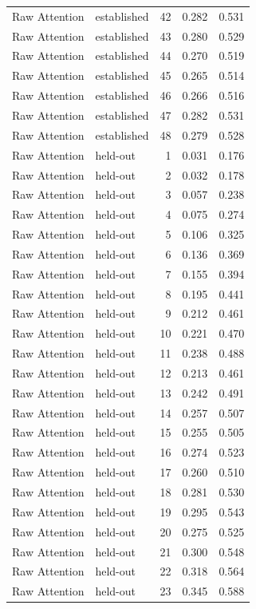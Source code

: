 \begin{tabular}{llrrr}
Raw Attention & established & 42 & 0.282 & 0.531 \\
Raw Attention & established & 43 & 0.280 & 0.529 \\
Raw Attention & established & 44 & 0.270 & 0.519 \\
Raw Attention & established & 45 & 0.265 & 0.514 \\
Raw Attention & established & 46 & 0.266 & 0.516 \\
Raw Attention & established & 47 & 0.282 & 0.531 \\
Raw Attention & established & 48 & 0.279 & 0.528 \\
Raw Attention & held-out & 1 & 0.031 & 0.176 \\
Raw Attention & held-out & 2 & 0.032 & 0.178 \\
Raw Attention & held-out & 3 & 0.057 & 0.238 \\
Raw Attention & held-out & 4 & 0.075 & 0.274 \\
Raw Attention & held-out & 5 & 0.106 & 0.325 \\
Raw Attention & held-out & 6 & 0.136 & 0.369 \\
Raw Attention & held-out & 7 & 0.155 & 0.394 \\
Raw Attention & held-out & 8 & 0.195 & 0.441 \\
Raw Attention & held-out & 9 & 0.212 & 0.461 \\
Raw Attention & held-out & 10 & 0.221 & 0.470 \\
Raw Attention & held-out & 11 & 0.238 & 0.488 \\
Raw Attention & held-out & 12 & 0.213 & 0.461 \\
Raw Attention & held-out & 13 & 0.242 & 0.491 \\
Raw Attention & held-out & 14 & 0.257 & 0.507 \\
Raw Attention & held-out & 15 & 0.255 & 0.505 \\
Raw Attention & held-out & 16 & 0.274 & 0.523 \\
Raw Attention & held-out & 17 & 0.260 & 0.510 \\
Raw Attention & held-out & 18 & 0.281 & 0.530 \\
Raw Attention & held-out & 19 & 0.295 & 0.543 \\
Raw Attention & held-out & 20 & 0.275 & 0.525 \\
Raw Attention & held-out & 21 & 0.300 & 0.548 \\
Raw Attention & held-out & 22 & 0.318 & 0.564 \\
Raw Attention & held-out & 23 & 0.345 & 0.588 \\

\end{tabular}
